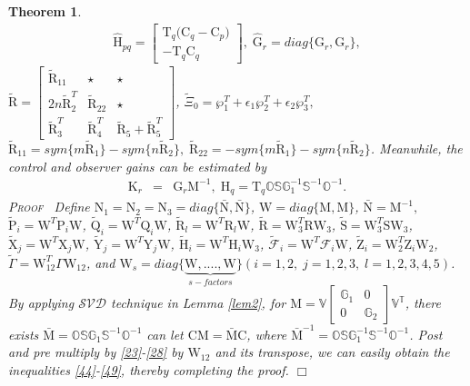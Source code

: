 \documentclass[preprint,11pt]{elsarticle}
\newtheorem{Thm}{Theorem}
\newenvironment{proof}{\noindent \textsc{Proof}\ }{\mbox{}\hfill $\Box$\\}
\begin{document}
\begin{Thm}
\begin{align*}
\mathrm{\hat{H}}_{pq}=
\begin{bmatrix}
\mathrm{T}_q \big(\mathrm{C}_{q}-\mathrm{C}_{p}\big)\\
-\mathrm{T}_q \mathrm{C}_{q}
\end{bmatrix},\;\mathrm{\widehat{G}}_r=diag\{\mathrm{{G}}_r,\mathrm{{G}}_r\},
\end{align*}
$\mathrm{\tilde{R}}=
\begin{bmatrix}
\mathrm{\tilde{R}}_{11}  &   \star&  \star\\
2n\mathrm{\tilde{R}}^T_{2}& \mathrm{\tilde{R}}_{22} &  \star\\
\mathrm{\tilde{R}}^T_{3} & \mathrm{\tilde{R}}^T_{4}& \mathrm{\tilde{R}}_{5}+\mathrm{\tilde{R}}^T_{5}
\end{bmatrix}$, $\tilde{\Xi}_0=\wp^T_1+\epsilon_1\wp^T_2+\epsilon_2\wp^T_3,$ $\mathrm{\tilde{R}}_{11}=sym\{m\mathrm{\tilde{R}}_1\}-sym\{n\mathrm{\tilde{R}}_2\},\;
\mathrm{\tilde{R}}_{22}=-sym\{m\mathrm{\tilde{R}}_1\}-sym\{n\mathrm{\tilde{R}}_2\}$.
Meanwhile, the control and observer gains can be estimated by
\begin{eqnarray}
\mathrm{K}_{r}&=&\mathrm{G}_{r} \mathrm{M}^{-1},\;
\mathrm{H}_{q}=\mathrm{T}_{q} \mathbb{O}\mathbb{S}\mathbb{G}^{-1}_1\mathbb{S}^{-1}\mathbb{O}^{-1}.\label{50}
\end{eqnarray}
\begin{proof}
Define $\mathrm{N}_1=\mathrm{N}_2=\mathrm{N}_3=diag\{\mathrm{\bar{N}},\mathrm{\bar{N}}\}$, $\mathrm{W}=diag\{\mathrm{M},\mathrm{M}\}$, $\mathrm{\bar{N}}=\mathrm{M}^{-1},$
$\mathrm{\tilde{P}}_i=\mathrm{W}^T\mathrm{P}_i\mathrm{W}$, $\mathrm{\tilde{Q}}_i=\mathrm{W}^T\mathrm{Q}_i\mathrm{W}$, $\mathrm{\tilde{R}}_l=\mathrm{W}^T \mathrm{R}_l\mathrm{W}$, $\mathrm{\tilde{R}}=\mathrm{W}_3^T\mathrm{R}\mathrm{W}_3$,
$\mathrm{\tilde{S}}=\mathrm{W}_3^T\mathrm{S}\mathrm{W}_3$,
$\mathrm{\tilde{X}}_j=\mathrm{W}^T \mathrm{X}_j\mathrm{W}$, $\mathrm{\tilde{Y}}_j=\mathrm{W}^T \mathrm{Y}_j\mathrm{W}$,
$\mathrm{\tilde{H}}_i=\mathrm{W}^T \mathrm{H}_i\mathrm{W}_3$,
${\tilde{\mathcal{F}}_i}=\mathrm{W}^T {\mathcal{F}}_i\mathrm{W}$,
$\mathrm{\tilde{Z}}_i=\mathrm{W}_2^T \mathrm{Z}_i\mathrm{W}_2$,
$\tilde{\Gamma}=\mathrm{W}_{12}^T \Gamma\mathrm{W}_{12}$, and
$\mathrm{W}_s=diag\{\underbrace{\mathrm{W},....,\mathrm{W}}_{s-factors}\}(i=1,2,\;j=1,2,3,\;l=1,2,3,4,5)$. By applying $\mathcal{\mathcal{SVD}}$ technique in Lemma \ref{lem2}, for
$\mathrm{M}=\mathbb{V}\begin{bmatrix}
\mathbb{G}_1& 0\\
0&\mathbb{G}_2
\end{bmatrix}\mathbb{V^T}$, there exists $\mathrm{\bar{M}}=\mathbb{O}\mathbb{S}\mathbb{G}_1\mathbb{S}^{-1}\mathbb{O}^{-1}$ can let $\mathrm{C}\mathrm{M}=\mathrm{\bar{M}}\mathrm{C}$, where $\mathrm{\bar{M}}^{-1}=\mathbb{O}\mathbb{S}\mathbb{G}^{-1}_1\mathbb{S}^{-1}\mathbb{O}^{-1}$. Post and pre multiply by \eqref{23}-\eqref{28} by $\mathrm{W}_{12}$ and
its transpose, we can easily obtain the inequalities \eqref{44}-\eqref{49}, thereby completing the proof.
\end{proof}
\vspace{-0.8cm}
\end{Thm}
\end{document}
